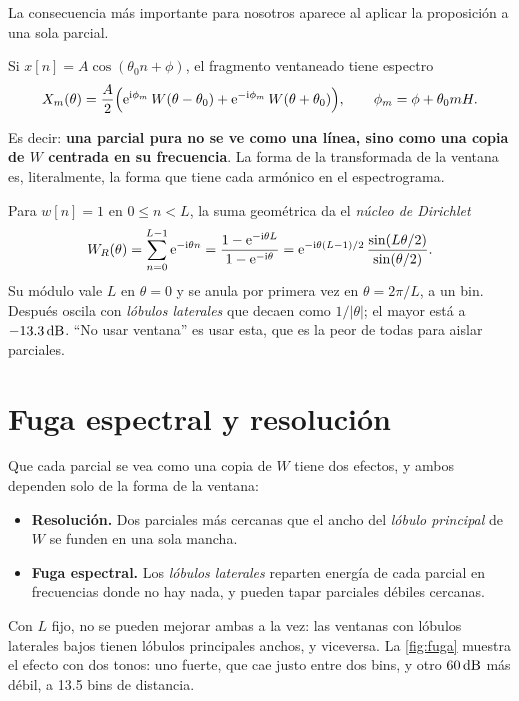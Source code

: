 La consecuencia más importante para nosotros aparece al aplicar la proposición a una sola
parcial.

\begin{corolario}\label{cor:parcial}
Si $x[n]=A\cos(\theta_0 n+\phi)$, el fragmento ventaneado tiene espectro
\[
  X_m(\theta)=\frac{A}{2}\Bigl(\mathrm{e}^{\mathrm{i}\phi_m}\,W(\theta-\theta_0)+\mathrm{e}^{-\mathrm{i}\phi_m}\,W(\theta+\theta_0)\Bigr),
  \qquad \phi_m=\phi+\theta_0 mH .
\]
\end{corolario}

Es decir: \textbf{una parcial pura no se ve como una línea, sino como una copia de $W$ centrada en
su frecuencia}. La forma de la transformada de la ventana es, literalmente, la forma que tiene
cada armónico en el espectrograma.

\begin{ejemplo}
Para $w[n]=1$ en $0\le n<L$, la suma geométrica da el \emph{núcleo de Dirichlet}
\[
  W_R(\theta)=\sum_{n=0}^{L-1}\mathrm{e}^{-\mathrm{i}\theta n}=\frac{1-\mathrm{e}^{-\mathrm{i}\theta L}}{1-\mathrm{e}^{-\mathrm{i}\theta}}
           =\mathrm{e}^{-\mathrm{i}\theta(L-1)/2}\,\frac{\sin(L\theta/2)}{\sin(\theta/2)} .
\]
Su módulo vale $L$ en $\theta=0$ y se anula por primera vez en $\theta=2\pi/L$, a un bin.
Después oscila con \emph{lóbulos laterales} que decaen como $1/|\theta|$; el mayor está a
$-13.3\,\mathrm{dB}$. ``No usar ventana'' es usar esta, que es la peor de todas para aislar parciales.
\end{ejemplo}

\section{Fuga espectral y resolución}

Que cada parcial se vea como una copia de $W$ tiene dos efectos, y ambos dependen solo de la forma
de la ventana:
\begin{itemize}
  \item \textbf{Resolución.} Dos parciales más cercanas que el ancho del \emph{lóbulo principal}
        de $W$ se funden en una sola mancha.
  \item \textbf{Fuga espectral.} Los \emph{lóbulos laterales} reparten energía de cada parcial en
        frecuencias donde no hay nada, y pueden tapar parciales débiles cercanas.
\end{itemize}
Con $L$ fijo, no se pueden mejorar ambas a la vez: las ventanas con lóbulos laterales bajos tienen
lóbulos principales anchos, y viceversa. La \cref{fig:fuga} muestra el efecto con dos tonos: uno
fuerte, que cae justo entre dos bins, y otro $60\,\mathrm{dB}$ más débil, a 13.5 bins de distancia.

